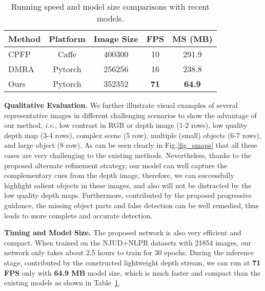 \documentclass[runningheads]{llncs}
\begin{document}
\setlength{\tabcolsep}{6pt}
\begin{table}[]
\begin{center}
\caption{Running speed and model size comparisons with recent models.}
\label{table_time}
\begin{tabular}{lcccc}
\hline
\hline
Method & Platform & Image Size & FPS & MS (MB) \\ \hline
CPFP~\cite{zhao2019contrast}   & Caffe    & 400300     &  10   & 291.9       \\
DMRA~\cite{piao2019depth}   & Pytorch  & 256256     & 16  & 238.8     \\
Ours   & Pytorch  & 352352     & \textbf{71}  & \textbf{64.9}      \\ \hline
\hline
\end{tabular}
\end{center}
\end{table}
\setlength{\tabcolsep}{1.6pt}


\textbf{Qualitative Evaluation.} We further illustrate visual examples of several representative images in different challenging scenarios to show the advantage of our method, \textit{i.e.}, low contrast in RGB or depth image (1-2 rows), low quality depth map (3-4 rows), complex scene (5 row), multiple (small) objects (6-7 rows), and large object (8 row). As can be seen clearly in Fig.\ref{fig_smaps} that all these cases are very challenging to the existing methods. Nevertheless, thanks to the proposed alternate refinement strategy, our model can well capture the complementary cues from the depth image, therefore, we can successfully highlight salient objects in these images, and also will not be distracted by the low quality depth maps. Furthermore, contributed by the proposed progressive guidance, the missing object parts and false detection can be well remedied, thus leads to more complete and accurate detection.

\textbf{Timing and Model Size.} The proposed network is also very efficient and compact. When trained on the NJUD+NLPR datasets with 21854 images, our network only takes about 2.5 hours to train for 30 epochs. During the inference stage, contributed by the constructed lightweight depth stream, we can run at \textbf{71 FPS} only with \textbf{64.9 MB} model size, which is much faster and compact than the existing models as shown in Table~\ref{table_time}.
\end{document}
